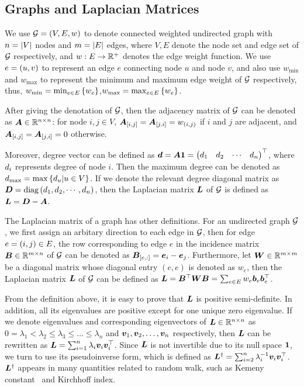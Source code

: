 \documentclass[sigconf]{acmart}
\begin{document}
\subsection{Graphs and Laplacian Matrices}\label{sub:lap}

We use \(\mathcal{G}=(V,E,w)\) to denote connected weighted undirected graph with \(n=\left|V \right|\) nodes and \(m=\left|E \right|\) edges, where \(V,E\) denote the node set and edge set of \(\mathcal{G}\) respectively, and \(w:E\to\mathbb{R}^+\) denotes the edge weight function.
We use \(e=\left( u,v \right)\) to represent an edge \(e\) connecting node \(u\) and node \(v\), and also use \(w_{\min}\) and \(w_{\max}\) to represent the minimum and maximum edge weight of \(\mathcal{G}\) respectively, thus, \(w_{\min}=\min_{e\in E}\left\{w_e \right\}\),\(w_{\max}=\max_{e\in E}\left\{w_e \right\}\).

After giving the denotation of \(\mathcal{G}\), then the adjacency matrix of \(\mathcal{G}\) can be denoted as \(\boldsymbol{A}\in \mathbb{R}^{n\times n}\): for node \(i,j\in V\), \(\boldsymbol{A}_{[i,j]}=\boldsymbol{A}_{[j,i]}=w_{\left( i,j \right)}\) if \(i\) and \(j\) are adjacent, and \(\boldsymbol{A}_{[i,j]}=\boldsymbol{A}_{[j,i]}=0\) otherwise.

Moreover, degree vector can be defined as \(\boldsymbol{d}=\boldsymbol{A}\boldsymbol{1}=\begin{pmatrix}d_1&d_2&\cdots&d_n\end{pmatrix}^\top\), where \(d_i\) represents degree of node \(i\).
Then the maximum degree can be denoted as \(d_{\max}=\max\left\{d_u|u\in V \right\}\).
If we denote the relevant degree diagonal matrix as \(\boldsymbol{D}={\rm{diag}}\left( d_1,d_2,\cdots,d_n \right)\), then the Laplacian matrix \(\boldsymbol{L}\) of \(\mathcal{G}\) is defined as \(\boldsymbol{L}=\boldsymbol{D}-\boldsymbol{A}\).

The Laplacian matrix of a graph has other definitions.
For an undirected graph \(\mathcal{G}\), we first assign an arbitary direction to each edge in \(\mathcal{G}\), then for edge \(e=\left( i,j \right)\in E\), the row corresponding to edge \(e\) in the incidence matrix \(\boldsymbol{B}\in\mathbb{R}^{m\times n}\) of \(\mathcal{G}\) can be denoted as \(\boldsymbol{B}_{[e,:]}=\boldsymbol{e}_i-\boldsymbol{e}_j\).
Furthermore, let \(\boldsymbol{W}\in\mathbb{R}^{m\times m}\) be a diagonal matrix whose diagonal entry \((e,e)\) is denoted as \(w_e\), then the Laplacian matrix \(\boldsymbol{L}\) of \(\mathcal{G}\) can be defined as \(\boldsymbol{L}=\boldsymbol{B}^\top\boldsymbol{W}\boldsymbol{B}=\sum_{e\in E}w_e\boldsymbol{b}_e\boldsymbol{b}_e^\top\).

From the definition above, it is easy to prove that \(\boldsymbol{L}\) is positive semi-definite.
In addition, all its eigenvalues are positive except for one unique zero eigenvalue.
If we denote eigenvalues and corresponding eigenvectors of \(\boldsymbol{L}\in\mathbb{R}^{n\times n}\) as \(0=\lambda_1<\lambda_2\le\lambda_3\le\dots\le\lambda_n\) and \(\boldsymbol{v}_1,\boldsymbol{v}_2,\dots,\boldsymbol{v}_n\) respectively, then \(\boldsymbol{L}\) can be rewritten as \(\boldsymbol{L}=\sum_{i=1}^n\lambda_i\boldsymbol{v}_i\boldsymbol{v}_i^\top\).
Since \(\boldsymbol{L}\) is not invertible due to its null space \(\boldsymbol{1}\), we turn to use its pseudoinverse form, which is defined as \(\boldsymbol{L}^\dagger=\sum_{i=2}^n\lambda_i^{-1}\boldsymbol{v}_i\boldsymbol{v}_i^\top\).
\(\boldsymbol{L}^\dagger\) appears in many quantities related to random walk, such as Kemeny constant~\cite{Hu14} and Kirchhoff index.
\end{document}
